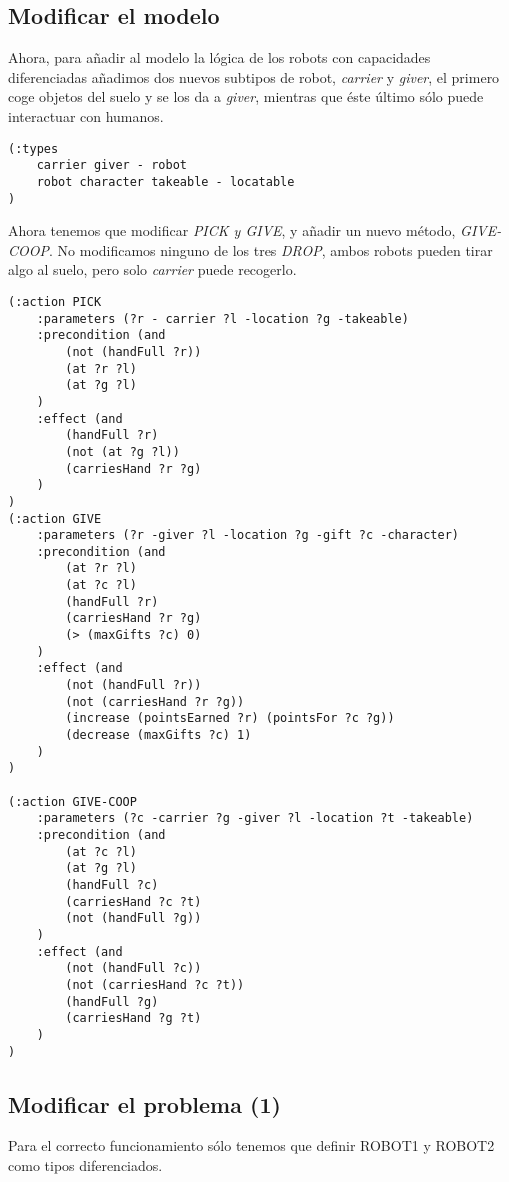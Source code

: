 \documentclass{article}
\begin{document}
\subsection{Modificar el modelo}

Ahora, para añadir al modelo la lógica de los robots con capacidades diferenciadas añadimos dos nuevos subtipos de robot, \emph{carrier} y \emph{giver}, el primero coge objetos del suelo y se los da a \emph{giver}, mientras que éste último sólo puede interactuar con humanos.

\begin{lstlisting}
(:types
	carrier giver - robot
    robot character takeable - locatable
)
\end{lstlisting}

Ahora tenemos que modificar \emph{PICK y GIVE}, y añadir un nuevo método, \emph{GIVE-COOP}. No modificamos ninguno de los tres \emph{DROP}, ambos robots pueden tirar algo al suelo, pero solo \emph{carrier} puede recogerlo.

\begin{lstlisting}
(:action PICK
    :parameters (?r - carrier ?l -location ?g -takeable)
    :precondition (and 
        (not (handFull ?r))
        (at ?r ?l)
        (at ?g ?l)
    )
    :effect (and 
        (handFull ?r)
        (not (at ?g ?l))
        (carriesHand ?r ?g)
    )
)
(:action GIVE
    :parameters (?r -giver ?l -location ?g -gift ?c -character)
    :precondition (and 
        (at ?r ?l)
        (at ?c ?l)
        (handFull ?r)
        (carriesHand ?r ?g)
        (> (maxGifts ?c) 0)
    )
    :effect (and 
        (not (handFull ?r))
        (not (carriesHand ?r ?g))
        (increase (pointsEarned ?r) (pointsFor ?c ?g))
        (decrease (maxGifts ?c) 1)
    )
)

(:action GIVE-COOP
    :parameters (?c -carrier ?g -giver ?l -location ?t -takeable)
    :precondition (and 
        (at ?c ?l)
        (at ?g ?l)
        (handFull ?c)
        (carriesHand ?c ?t)
        (not (handFull ?g))
    )
    :effect (and 
        (not (handFull ?c))
        (not (carriesHand ?c ?t))
        (handFull ?g)
        (carriesHand ?g ?t)
    )
)
\end{lstlisting}


\subsection{Modificar el problema (1)}

	Para el correcto funcionamiento sólo tenemos que definir ROBOT1 y ROBOT2 como tipos diferenciados.
	
\end{document}
